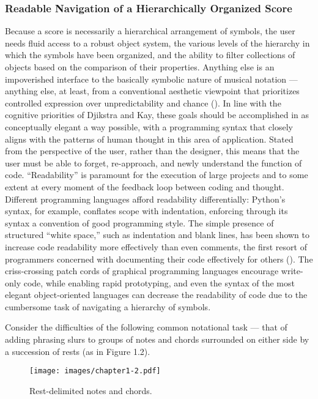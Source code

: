 \subsubsection{Readable Navigation of a Hierarchically Organized Score}
Because a score is necessarily a hierarchical arrangement of symbols, the user needs fluid access to a robust object system, the various levels of the hierarchy in which the symbols have been organized, and the ability to filter collections of objects based on the comparison of their properties. Anything else is an impoverished interface to the basically symbolic nature of musical notation --- anything else, at least, from a conventional aesthetic viewpoint that prioritizes controlled expression over unpredictability and chance (\cite{Gurevich:2007qe}). In line with the cognitive priorities of Djikstra and Kay, these goals should be accomplished in as conceptually elegant a way possible, with a programming syntax that closely aligns with the patterns of human thought in this area of application. Stated from the perspective of the user, rather than the designer, this means that the user must be able to forget, re-approach, and newly understand the function of code. ``Readability'' is paramount for the execution of large projects and to some extent at every moment of the feedback loop between coding and thought. Different programming languages afford readability differentially: Python's syntax, for example, conflates scope with indentation, enforcing through its syntax a convention of good programming style. The simple presence of structured ``white space,'' such as indentation and blank lines, has been shown to increase code readability more effectively than even comments, the first resort of programmers concerned with documenting their code effectively for others (\cite{Buse:2010uq}). The criss-crossing patch cords of graphical programming languages encourage write-only code, while enabling rapid prototyping, and even the syntax of the most elegant object-oriented languages can decrease the readability of code due to the cumbersome task of navigating a hierarchy of symbols. 

Consider the difficulties of the following common notational task --- that of adding phrasing slurs to groups of notes and chords surrounded on either side by a succession of rests (as in Figure 1.2).

\begin{figure}[h] 
\centering
\texttt{[image: images/chapter1-2.pdf]}

\caption{Rest-delimited notes and chords.} 
\end{figure}

